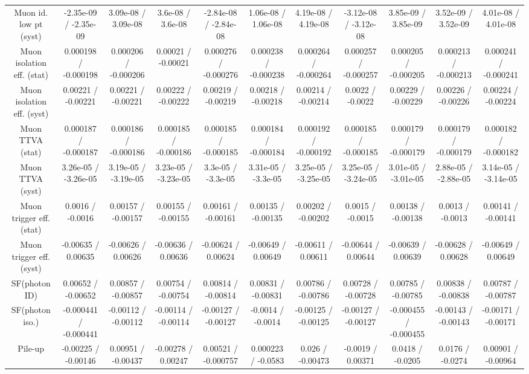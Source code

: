 \begin{table}[htbp]
\begin{center}
\begin{tabular}{|c|c|c|c|c|c|c|c|c|c|c|}
  Muon id. low pt (syst) & -2.35e-09 / -2.35e-09 & 3.09e-08 / 3.09e-08 & 3.6e-08 / 3.6e-08 & -2.84e-08 / -2.84e-08 & 1.06e-08 / 1.06e-08 & 4.19e-08 / 4.19e-08 & -3.12e-08 / -3.12e-08 & 3.85e-09 / 3.85e-09 & 3.52e-09 / 3.52e-09 & 4.01e-08 / 4.01e-08 \\ 
  Muon isolation eff. (stat) & 0.000198 / -0.000198 & 0.000206 / -0.000206 & 0.00021 / -0.00021 & 0.000276 / -0.000276 & 0.000238 / -0.000238 & 0.000264 / -0.000264 & 0.000257 / -0.000257 & 0.000205 / -0.000205 & 0.000213 / -0.000213 & 0.000241 / -0.000241 \\ 
  Muon isolation eff. (syst) & 0.00221 / -0.00221 & 0.00221 / -0.00221 & 0.00222 / -0.00222 & 0.00219 / -0.00219 & 0.00218 / -0.00218 & 0.00214 / -0.00214 & 0.0022 / -0.0022 & 0.00229 / -0.00229 & 0.00226 / -0.00226 & 0.00224 / -0.00224 \\ 
  Muon TTVA (stat) & 0.000187 / -0.000187 & 0.000186 / -0.000186 & 0.000185 / -0.000186 & 0.000185 / -0.000185 & 0.000184 / -0.000184 & 0.000192 / -0.000192 & 0.000185 / -0.000185 & 0.000179 / -0.000179 & 0.000179 / -0.000179 & 0.000182 / -0.000182 \\ 
  Muon TTVA (syst) & 3.26e-05 / -3.26e-05 & 3.19e-05 / -3.19e-05 & 3.23e-05 / -3.23e-05 & 3.3e-05 / -3.3e-05 & 3.31e-05 / -3.3e-05 & 3.25e-05 / -3.25e-05 & 3.25e-05 / -3.24e-05 & 3.01e-05 / -3.01e-05 & 2.88e-05 / -2.88e-05 & 3.14e-05 / -3.14e-05 \\ 
  Muon trigger eff. (stat) & 0.0016 / -0.0016 & 0.00157 / -0.00157 & 0.00155 / -0.00155 & 0.00161 / -0.00161 & 0.00135 / -0.00135 & 0.00202 / -0.00202 & 0.0015 / -0.0015 & 0.00138 / -0.00138 & 0.0013 / -0.0013 & 0.00141 / -0.00141 \\ 
  Muon trigger eff. (syst) & -0.00635 / 0.00635 & -0.00626 / 0.00626 & -0.00636 / 0.00636 & -0.00624 / 0.00624 & -0.00649 / 0.00649 & -0.00611 / 0.00611 & -0.00644 / 0.00644 & -0.00639 / 0.00639 & -0.00628 / 0.00628 & -0.00649 / 0.00649 \\ 
  SF(photon ID) & 0.00652 / -0.00652 & 0.00857 / -0.00857 & 0.00754 / -0.00754 & 0.00814 / -0.00814 & 0.00831 / -0.00831 & 0.00786 / -0.00786 & 0.00728 / -0.00728 & 0.00785 / -0.00785 & 0.00838 / -0.00838 & 0.00787 / -0.00787 \\ 
  SF(photon iso.) & -0.000441 / -0.000441 & -0.00112 / -0.00112 & -0.00114 / -0.00114 & -0.00127 / -0.00127 & -0.0014 / -0.0014 & -0.00125 / -0.00125 & -0.00127 / -0.00127 & -0.000455 / -0.000455 & -0.00143 / -0.00143 & -0.00171 / -0.00171 \\ 
  Pile-up & -0.00225 / -0.00146 & 0.00951 / -0.00437 & -0.00278 / 0.00247 & 0.00521 / -0.000757 & 0.000223 / -0.0583 & 0.026 / -0.00473 & -0.0019 / 0.00371 & 0.0418 / -0.0205 & 0.0176 / -0.0274 & 0.00901 / -0.00964 \\ 

\end{tabular}
\end{center}
\end{table}
